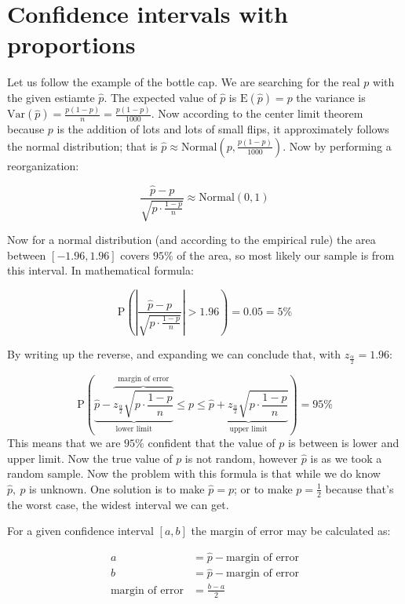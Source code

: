 \section{Confidence intervals with proportions}

Let us follow the example of the bottle cap. We are searching for the real $p$
with the given estiamte $\hat{p}$. The expected value of $\hat{p}$ is
$\mbox{E}(\hat{p})=p$ the variance is $\mbox{Var}(\hat{p}) =
\frac{p(1-p)}{n}=\frac{p(1-p)}{1000}$. Now according to the center limit theorem
because $p$ is the addition of lots and lots of small flips, it approximately
follows the normal distribution; that is $\hat{p} \approx
\mbox{Normal}\left(p, \frac{p(1-p)}{1000}\right)$. Now by performing a
reorganization: 

\[ \frac{\hat{p}-p}{\sqrt{p\cdot\frac{1-p}{n}}} \approx \mbox{Normal}(0,1) \]

Now for a normal distribution (and according to the empirical rule) the area
between $[-1.96, 1.96]$ covers $95\%$ of the area, so most likely our sample is
from this interval. In mathematical formula:


\[ \mbox{P} \left( \left| \frac{\hat{p}-p}{\sqrt{p\cdot\frac{1-p}{n}}} \right| >
1.96\right) = 0.05 = 5\%
\]

By writing up the reverse, and expanding we can conclude that, with
$z_{\frac{\alpha}{2}} = 1.96$:

\[ \mbox{P} \left( \underbrace{\hat{p} - \overbrace{z_{\frac{\alpha}{2}}\sqrt{p
\cdot \frac{1-p}{n}}}^{\mbox{margin of error}}}_{\mbox{lower limit}} \leq p \leq
\underbrace{\hat{p} + z_{\frac{\alpha}{2}}\sqrt{p \cdot
\frac{1-p}{n}}}_{\mbox{upper limit}} \right) = 95\%
\]
This means that we are $95\%$ confident that the value of $p$ is between is
lower and upper limit. Now the true value of $p$ is not random, however
$\hat{p}$ is as we took a random sample. Now the problem with this formula is
that while we do know $\hat{p},~p$ is unknown. One solution is to make
$\hat{p}=p$; or to make $p=\frac{1}{2}$ because that's the worst case, the
widest interval we can get.

For a given confidence interval $[a,b]$ the margin of error may be calculated
as:

\begin{align*}
a &= \hat{p} - \mbox{margin of error} \\
  b &= \hat{p} - \mbox{margin of error} \\ 
  \mbox{margin of error} &= \frac{b-a}{2}
\end{align*} 

